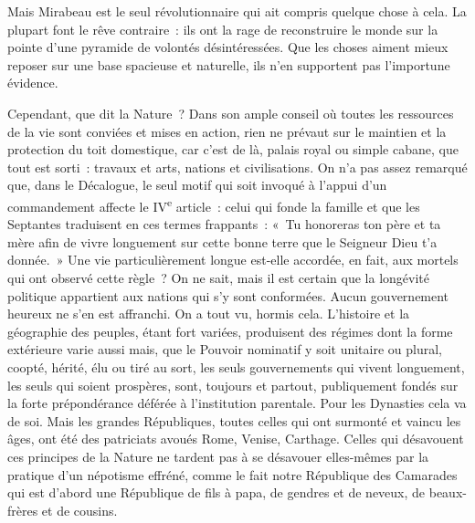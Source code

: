 \documentclass[french,twoside]{book} %
\begin{document}
Mais Mirabeau est le seul révolutionnaire qui ait compris quelque chose à cela. La plupart font le rêve contraire : ils ont la rage de reconstruire le monde sur la pointe d’une pyramide de volontés désintéressées. Que les choses aiment mieux reposer sur une base spacieuse et naturelle, ils n’en supportent pas l’importune évidence.\par
Cependant, que dit la Nature ? Dans son ample conseil où toutes les ressources de la vie sont conviées et mises en action, rien ne prévaut sur le maintien et la protection du toit domestique, car c’est de là, palais royal ou simple cabane, que tout est sorti : travaux et arts, nations et civilisations. On n’a pas assez remarqué que, dans le Décalogue, le seul motif qui soit invoqué à l’appui d’un commandement affecte le IV\textsuperscript{e} article : celui qui fonde la famille et que les Septantes traduisent en ces termes frappants : « Tu honoreras ton père et ta mère afin de vivre longuement sur cette bonne terre que le Seigneur Dieu t’a donnée. » Une vie particulièrement longue est-elle accordée, en fait, aux mortels qui ont observé cette règle ? On ne sait, mais il est certain que la longévité politique appartient aux nations qui s’y sont conformées. Aucun gouvernement heureux ne s’en est affranchi. On a tout vu, hormis cela. L’histoire et la géographie des peuples, étant fort variées, produisent des régimes dont la forme extérieure varie aussi mais, que le Pouvoir nominatif y soit unitaire ou plural, coopté, hérité, élu ou tiré au sort, les seuls gouvernements qui vivent longuement, les seuls qui soient prospères, sont, toujours et partout, publiquement fondés sur la forte prépondérance déférée à l’institution parentale. Pour les Dynasties cela va de soi. Mais les grandes Républiques, toutes celles qui ont surmonté et vaincu les âges, ont été des patriciats avoués Rome, Venise, Carthage. Celles qui désavouent ces principes de la Nature ne tardent pas à se désavouer elles-mêmes par la pratique d’un népotisme effréné, comme le fait notre République des Camarades qui est d’abord une République de fils à papa, de gendres et de neveux, de beaux-frères et de cousins.\par
\end{document}
